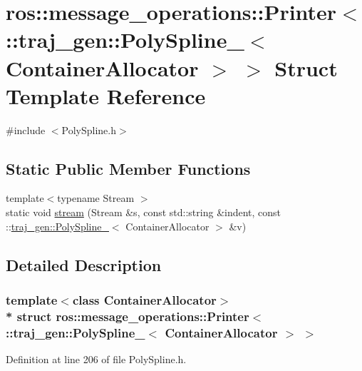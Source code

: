 \hypertarget{structros_1_1message__operations_1_1_printer_3_01_1_1traj__gen_1_1_poly_spline___3_01_container_allocator_01_4_01_4}{}\section{ros\+:\+:message\+\_\+operations\+:\+:Printer$<$ \+:\+:traj\+\_\+gen\+:\+:Poly\+Spline\+\_\+$<$ Container\+Allocator $>$ $>$ Struct Template Reference}
\label{structros_1_1message__operations_1_1_printer_3_01_1_1traj__gen_1_1_poly_spline___3_01_container_allocator_01_4_01_4}


{\ttfamily \#include $<$Poly\+Spline.\+h$>$}

\subsection*{Static Public Member Functions}
\begin{DoxyCompactItemize}
\item 
{\footnotesize template$<$typename Stream $>$ }\\static void \hyperlink{structros_1_1message__operations_1_1_printer_3_01_1_1traj__gen_1_1_poly_spline___3_01_container_allocator_01_4_01_4_af01d9f7602ab610ee7c039231722d671}{stream} (Stream \&s, const std\+::string \&indent, const \+::\hyperlink{structtraj__gen_1_1_poly_spline__}{traj\+\_\+gen\+::\+Poly\+Spline\+\_\+}$<$ Container\+Allocator $>$ \&v)
\end{DoxyCompactItemize}


\subsection{Detailed Description}
\subsubsection*{template$<$class Container\+Allocator$>$\\*
struct ros\+::message\+\_\+operations\+::\+Printer$<$ \+::traj\+\_\+gen\+::\+Poly\+Spline\+\_\+$<$ Container\+Allocator $>$ $>$}



Definition at line 206 of file Poly\+Spline.\+h.




